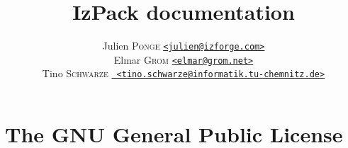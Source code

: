 \documentclass[a4paper, 12pt, pdftex]{report}
\title{\Huge{\textbf{IzPack documentation}}}
\author{Julien \textsc{Ponge} \href{mailto:julien@izforge.com}{\texttt{<julien@izforge.com>}} \\
        Elmar \textsc{Grom} \href{mailto:elmar@grom.net}{\texttt{<elmar@grom.net>}} \\
        Tino \textsc{Schwarze} \href{mailto:tino.schwarze@informatik.tu-chemnitz.de}{\texttt{
                               <tino.schwarze@informatik.tu-chemnitz.de>}}
       }
\begin{document}
  \maketitle
  \tableofcontents

  
  
  
  
  
  
  

  \appendix
  \chapter{The GNU General Public License}
  \footnotesize
  
  \normalsize
\end{document}
